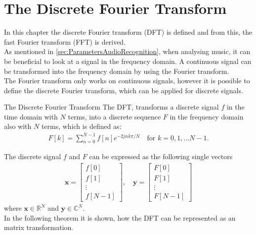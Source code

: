 \chapter{The Discrete Fourier Transform} \label{ch:DFT}
In this chapter the discrete Fourier transform (DFT) is defined and from this, the fast Fourier transform (FFT) is derived.\\

As mentioned in \autoref{sec:ParametersAudioRecognition}, when analysing music, it can be beneficial to look at a signal in the frequency domain. A continuous signal can be transformed into the frequency domain by using the Fourier transform. 
\\
The Fourier transform only works on continuous signals, however it is possible to define the discrete Fourier transform, which can be applied for discrete signals. 

\begin{definition}{The Discrete Fourier Transform}
    The DFT, transforms a discrete signal $f$ in the time domain with $N$ terms, into a discrete sequence $F$ in the frequency domain also with $N$ terms, which is defined as: 
    \begin{align*}
        F[k]=\sum^{N-1}_{n=0}f[n]e^{-2jnk\pi/N}\quad \text{for } k=0, 1,... N-1 .
    \end{align*}
    \cite[5]{rao2011fast}
    \label{def:DFT_definiton}
\end{definition}
The discrete signal $f$ and $F$ can be expressed as the following single vectors 
\begin{align*}
    \textbf{x}=
    \begin{bmatrix}
    f[0]\\f[1]\\ \vdots \\ f[N-1]
    \end{bmatrix},
    \quad \textbf{y}=
    \begin{bmatrix}
    F[0]\\F[1]\\ \vdots \\ F[N-1]
    \end{bmatrix}
\end{align*}
where $\textbf{x} \in \mathds{R}^{N}$ and $\textbf{y} \in \mathds{C}^{N}$. 
\\
In the following theorem it is shown, how the DFT can be represented as an matrix transformation.

